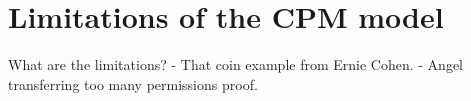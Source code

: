 \section{Limitations of the CPM model}
\label{sec:topbottom:limit}

What are the limitations?
- That coin example from Ernie Cohen.
- Angel transferring too many permissions proof.